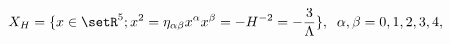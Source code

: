 \begin{equation}
X_H=\{x \in \setR^5 ;x^2=\eta_{\alpha\beta} x^\alpha x^\beta
=-H^{-2}=-\frac{3}{\Lambda}\},\;\;\alpha,\beta=0,1,2,3,4,
\end{equation}

